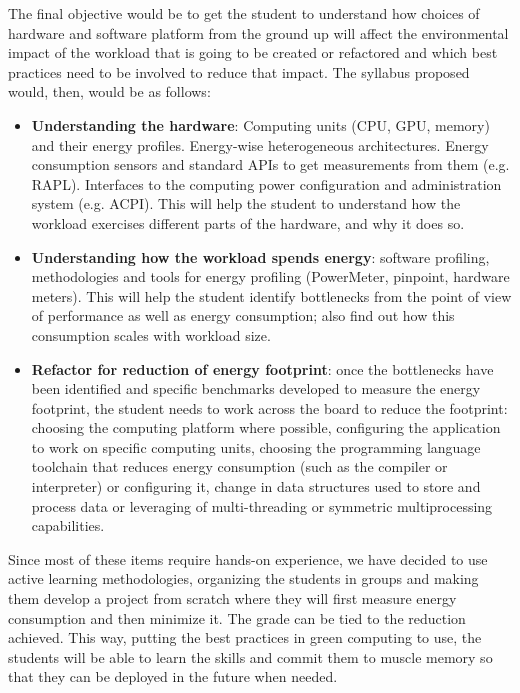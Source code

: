 \documentclass[sigconf]{acmart}
\begin{document}
The final objective would be to get the student to understand how choices of
hardware and software platform from the ground up will affect the environmental
impact of the workload that is going to be created or refactored and which best
practices need to be involved to reduce that impact. The syllabus proposed
would, then, would be as follows:\begin{itemize}
\item {\bf Understanding the hardware}: Computing units (CPU, GPU, memory) and their energy profiles. Energy-wise
  heterogeneous architectures. Energy consumption sensors and
  standard APIs to get measurements from them (e.g. RAPL). Interfaces to the
  computing power configuration and administration system (e.g. ACPI). This will
  help the student to understand how the workload exercises different parts of
  the hardware, and why it does so.
\item {\bf Understanding how the workload spends energy}: software profiling,
  methodologies and tools for energy profiling (PowerMeter, pinpoint, hardware meters). This will help the student identify
  bottlenecks from the point of view of performance as well as energy
  consumption; also find out how this consumption scales with workload size.
\item {\bf Refactor for reduction of energy footprint}: once the bottlenecks
  have been identified and specific benchmarks developed to measure the energy
  footprint, the student needs to work across the board to reduce the footprint:
  choosing the computing platform where possible, configuring the application to
  work on specific computing units, choosing the programming language toolchain
  that reduces energy consumption (such as the compiler or interpreter) or
  configuring it, change
  in data structures used to store and process data or leveraging of
  multi-threading or symmetric multiprocessing capabilities.
\end{itemize}

Since most of these items require hands-on experience, we have decided to use
active learning methodologies, organizing the students in groups and
making them develop a project from scratch where they will first measure energy
consumption and then minimize it. The grade can be tied to the
reduction achieved. This way, putting the best practices in green computing
to use, the students will be able to learn the skills and commit them to muscle
memory so that they can be deployed in the future when needed.



\end{document}
